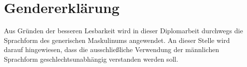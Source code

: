 \section*{Gendererklärung}

Aus Gründen der besseren Lesbarkeit wird in dieser Diplomarbeit durchwegs die Sprachform des
generischen Maskulinums angewendet. An dieser Stelle wird darauf hingewiesen, dass die
ausschließliche Verwendung der männlichen Sprachform geschlechtsunabhängig verstanden werden soll.

\newpage